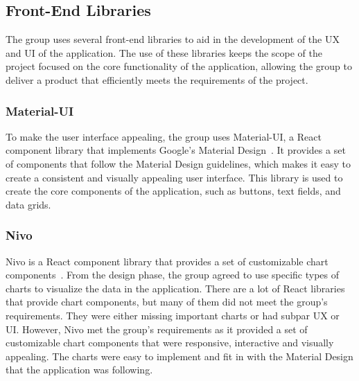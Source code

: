 \subsection{Front-End Libraries}\label{subsec:front-end-libraries}

The group uses several front-end libraries to aid in the development of the UX and UI of the application.
The use of these libraries keeps the scope of the project focused on the core functionality of the application, allowing
the group to deliver a product that efficiently meets the requirements of the project.

\subsubsection{Material-UI}\label{subsubsec:material-ui}

To make the user interface appealing, the group uses Material-UI, a React component library that implements Google's
Material Design~\cite{material-ui}.
It provides a set of components that follow the Material Design guidelines, which makes it easy to create a consistent
and visually appealing user interface.
This library is used to create the core components of the application, such as buttons, text fields, and data grids.

\subsubsection{Nivo}\label{subsubsec:nivo}

Nivo is a React component library that provides a set of customizable chart components~\cite{nivo2024}.
From the design phase, the group agreed to use specific types of charts to visualize the data in the application.
There are a lot of React libraries that provide chart components, but many of them did not meet the group's requirements.
They were either missing important charts or had subpar UX or UI.\@
However, Nivo met the group's requirements as it provided a set of customizable chart components that were
responsive, interactive and visually appealing.
The charts were easy to implement and fit in with the Material Design that the application was following.
